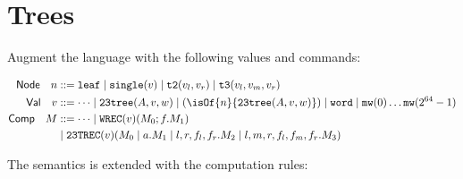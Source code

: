 \newcommand{\leaf}{\ensuremath{\mathtt{leaf}}}
\newcommand{\single}[1]{\ensuremath{\mathtt{single}(#1)}}
\newcommand{\ttwo}[2]{\ensuremath{\mathtt{t2}(#1,#2)}}
\newcommand{\tthree}[3]{\ensuremath{\mathtt{t3}(#1,#2,#3)}}
\newcommand{\ttrec}[8]{\mathtt{23TREC}(#1)(#2 \mid #3.#4 \mid #5.#6 \mid #7.#8)}
\newcommand{\tttree}[3]{\ensuremath{\mathtt{23tree}(#1,#2,#3)}}
\newcommand{\word}{\mathtt{word}}
\newcommand{\mw}[1]{\mathtt{mw}(#1)}
\newcommand{\wrec}[4]{\mathtt{WREC}(#1)(#2; #3.#4)}
\newcommand{\join}{\mathsf{join}}
\newcommand{\cmp}{\mathsf{cmp}}
\newcommand{\ifnat}[3]{\mathsf{if}(#1;#2;#3)}
\newcommand{\const}[1]{\lam{\_}{\_}{#1}}
\newcommand{\eq}{\mathsf{eq}}
\newcommand{\macro}{@\!\!=}
\newcommand{\wtonat}[1]{\mathsf{nat}(#1)}
\section{Trees}

Augment the language with the following values and commands:

\begin{align*}
    \mathsf{Node} \quad n &::= 
         \leaf
    \mid \single{v}
    \mid \ttwo{v_l}{v_r}
    \mid \tthree{v_l}{v_m}{v_r}\\
    \mathsf{Val} \quad v &::= \dots
    \mid \tttree{A}{v}{w}
    \mid (\isOf{n}{\tttree{A}{v}{w}})
    \mid \word
    \mid \mw{0} \dots \mw{2^{64}-1}\\
    \mathsf{Comp} \quad M &::= 
    \dots
    \mid \wrec{v}{M_0}{f}{M_1}\\
    &\mid \ttrec{v}{M_0}{a}{M_1}{l,r,f_l,f_r}{M_2}{l,m,r,f_l,f_m,f_r}{M_3}\\
\end{align*}

The semantics is extended with the computation rules:

